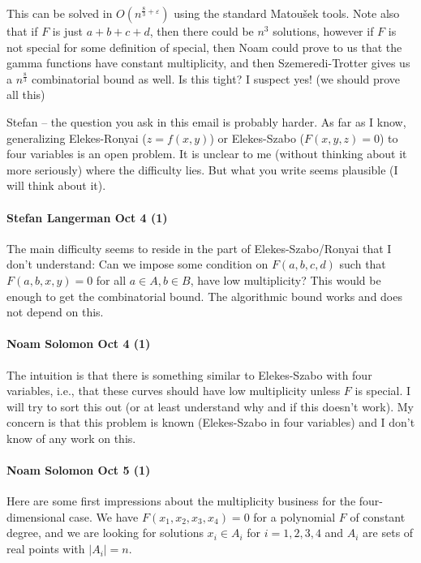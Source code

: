 \begin{displayquote}
This can be solved in $O(n^{\frac{8}{3}+\varepsilon})$ using the standard Matou\v{s}ek tools.
Note also that if $F$ is just $a+b+c+d$, then there could be $n^3$ solutions,
however if $F$ is not special for some definition of special, then
Noam could prove to us that the gamma functions have constant
multiplicity, and then Szemeredi-Trotter gives us a $n^{\frac{8}{3}}$ combinatorial
bound as well. Is this tight? I suspect yes! (we should prove all this)
\end{displayquote}

Stefan -- the question you ask in this email is probably harder. As far as I
know, generalizing Elekes-Ronyai ($z=f(x,y)$) or Elekes-Szabo ($F(x,y,z)=0$) to
four variables is an open problem. It is unclear to me (without thinking
about it more seriously) where the difficulty lies. But what you write
seems plausible (I will think about it).

\paragraph{Stefan Langerman Oct 4 (1)}
The main difficulty seems to reside in the part of
Elekes-Szabo/Ronyai that I don't understand: Can we impose some
condition on $F(a,b,c,d)$ such that $F(a,b,x,y)=0$ for all $a \in A, b \in B$,
have low multiplicity?
This would be enough to get the combinatorial bound.
The algorithmic bound works and does not depend on this.


\paragraph{Noam Solomon Oct 4 (1)}
The intuition is that there is something similar to Elekes-Szabo with four
variables, i.e., that these curves should have low multiplicity unless $F$ is
special. I will try to sort this out (or at least understand why and if
this doesn't work). My concern is that this problem is known (Elekes-Szabo
in four variables) and I don't know of any work on this.

\paragraph{Noam Solomon Oct 5 (1)}
Here are some first impressions about the multiplicity business for the
four-dimensional case.
We have $F(x_1,x_2,x_3,x_4)=0$ for a polynomial $F$ of constant degree, and we
are looking for solutions $x_i \in A_i$ for $i=1,2,3,4$ and $A_i$ are sets of
real points with $|A_i|=n$.

